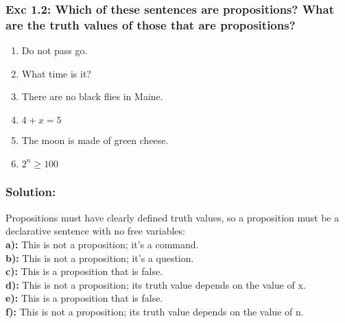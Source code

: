 \subsubsection*{Exc 1.2: Which of these sentences are propositions? What are the
truth values of those that are propositions?}
\begin{enumerate}[label=(\alph*)]
\item Do not pass go.
\item What time is it?
\item There are no black flies in Maine.
\item $4 + x = 5$
\item The moon is made of green cheese.
\item $2^n \geq 100$
\end{enumerate}
\subsubsection*{Solution:}
Propositions must have clearly defined truth values, so a proposition must be a declarative sentence with no
free variables:
\\
\textbf{a):} This is not a proposition; it’s a command.
\\
\textbf{b):} This is not a proposition; it’s a question.
\\
\textbf{c):} This is a proposition that is false.
\\
\textbf{d):} This is not a proposition; its truth value depends on the value of x.
\\
\textbf{e):} This is a proposition that is false.
\\
\textbf{f):} This is not a proposition; its truth value depends on the value of n.
